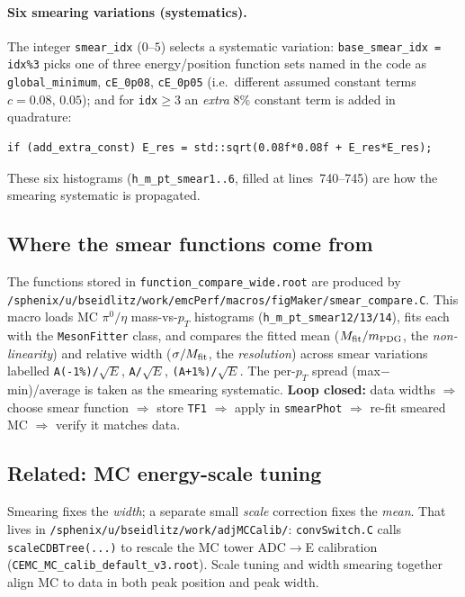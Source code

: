 \documentclass[11pt]{article}
\newcommand{\pp}[1]{\textcolor{pathcol}{\texttt{#1}}}
\begin{document}
\paragraph{Six smearing variations (systematics).} The integer
\texttt{smear\_idx} ($0\text{--}5$) selects a systematic variation:
\texttt{base\_smear\_idx = idx\%3} picks one of three energy/position function
sets named in the code as
\texttt{global\_minimum}, \texttt{cE\_0p08}, \texttt{cE\_0p05}
(i.e.\ different assumed constant terms $c=0.08,\,0.05$); and for
\texttt{idx}$\ge 3$ an \emph{extra} 8\% constant term is added in quadrature:
\begin{lstlisting}
if (add_extra_const) E_res = std::sqrt(0.08f*0.08f + E_res*E_res);
\end{lstlisting}
These six histograms (\texttt{h\_m\_pt\_smear1..6}, filled at lines~740--745)
are how the smearing systematic is propagated.

\subsection{Where the smear functions come from}
The functions stored in \texttt{function\_compare\_wide.root} are produced by\\
\pp{/sphenix/u/bseidlitz/work/emcPerf/macros/figMaker/smear\_compare.C}.
This macro loads MC $\pi^0/\eta$ mass-vs-$p_T$ histograms
(\texttt{h\_m\_pt\_smear12/13/14}), fits each with the \texttt{MesonFitter}
class, and compares the fitted mean ($M_{\rm fit}/m_{\rm PDG}$, the
\emph{non-linearity}) and relative width ($\sigma/M_{\rm fit}$, the
\emph{resolution}) across smear variations labelled
\texttt{A(-1\%)/$\sqrt{E}$}, \texttt{A/$\sqrt{E}$}, \texttt{(A+1\%)/$\sqrt{E}$}.
The per-$p_T$ spread (max$-$min)/average is taken as the smearing systematic.
\textbf{Loop closed:} data widths $\Rightarrow$ choose smear function
$\Rightarrow$ store \texttt{TF1} $\Rightarrow$ apply in \texttt{smearPhot}
$\Rightarrow$ re-fit smeared MC $\Rightarrow$ verify it matches data.

\subsection{Related: MC energy-scale tuning}
Smearing fixes the \emph{width}; a separate small \emph{scale} correction fixes
the \emph{mean}. That lives in
\pp{/sphenix/u/bseidlitz/work/adjMCCalib/}: \texttt{convSwitch.C} calls
\texttt{scaleCDBTree(...)} to rescale the MC tower ADC$\to$E calibration
(\texttt{CEMC\_MC\_calib\_default\_v3.root}). Scale tuning and width smearing
together align MC to data in both peak position and peak width.
\end{document}

